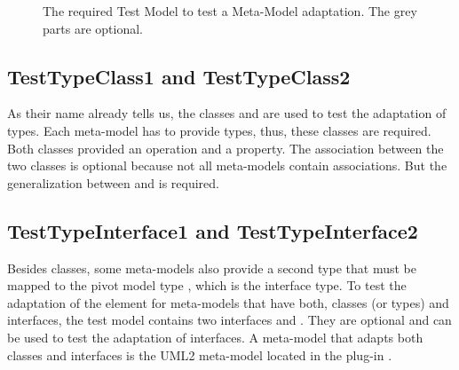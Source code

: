 \begin{figure}[!p]
	\centering
	\caption{The required Test Model to test a Meta-Model adaptation. The grey parts are optional.}
	\label{pic:metaModelTestsuite:testModel}
\end{figure}


\subsection{TestTypeClass1 and TestTypeClass2}

As their name already tells us, the classes  and  are used to test the adaptation of types. Each meta-model has to provide types, thus, these classes are required. Both classes provided an operation and a property. The association between the two classes is optional because not all meta-models contain associations. But the generalization between  and  is required.


\subsection{TestTypeInterface1 and TestTypeInterface2}

Besides classes, some meta-models also provide a second type that must be mapped to the pivot model type , which is the interface type. To test the adaptation of the  element for meta-models that have both, classes (or types) and interfaces, the test model contains two interfaces  and . They are optional and can be used to test the adaptation of interfaces. A meta-model that adapts both classes and interfaces is the \acs{UML}2 meta-model located in the plug-in .


